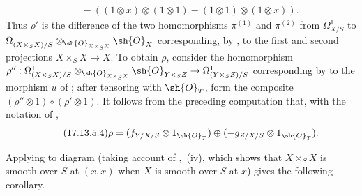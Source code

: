 \begin{env}[17.13.5]
\[\begin{split}
 &\quad-((1\otimes x)\otimes(1\otimes1)-(1\otimes1)\otimes(1\otimes x)).
\end{split}
\]
Thus $\rho'$ is the difference of the two homomorphisms $\pi^{(1)}$ and $\pi^{(2)}$ from $\Omega^1_{X/S}$ to
$\Omega^1_{(X\times_SX)/S}\otimes_{\sh{O}_{X\times_SX}}\sh{O}_X$
corresponding, by , to the first and second projections $X\times_SX\to X$.
To obtain $\rho$, consider the homomorphism
$\rho'':\Omega^1_{(X\times_SX)/S}\otimes_{\sh{O}_{X\times_SX}}\sh{O}_{Y\times_SZ}\to\Omega^1_{(Y\times_SZ)/S}$
corresponding by  to the morphism $u$ of ; after tensoring with $\sh{O}_T$, form the composite
$(\rho''\otimes1)\circ(\rho'\otimes1)$.
It follows from the preceding computation that, with the notation of ,
\[
\label{IV.17.13.5.4}
\tag{17.13.5.4}
\rho = (f_{Y/X/S}\otimes 1_{\sh{O}_T})\oplus(-g_{Z/X/S}\otimes 1_{\sh{O}_T}).
\]

Applying  to diagram  (taking account of ,~(iv), which shows that $X\times_SX$ is smooth over $S$ at $(x,x)$ when $X$ is smooth over $S$ at $x$) gives the following corollary.
\end{env}

